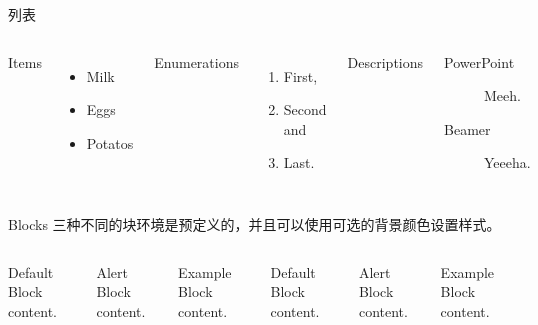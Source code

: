 \documentclass[9pt,UTF8]{ctexbeamer}
\begin{document}
\begin{frame}{列表}
  \begin{columns}[T,onlytextwidth]
      Items
      \begin{itemize}
        \item Milk 
        \item Eggs 
        \item Potatos
      \end{itemize}

      Enumerations
      \begin{enumerate}
        \item First, 
        \item Second and 
        \item Last.
      \end{enumerate}

      Descriptions
      \begin{description}
        \item[PowerPoint] Meeh. 
        \item[Beamer] Yeeeha.
      \end{description}
  \end{columns}
\end{frame}

\begin{frame}{Blocks}
  三种不同的块环境是预定义的，并且可以使用可选的背景颜色设置样式。

  \begin{columns}[T,onlytextwidth]
      \begin{block}{Default}
        Block content.
      \end{block}

      \begin{alertblock}{Alert}
        Block content.
      \end{alertblock}

      \begin{exampleblock}{Example}
        Block content.
      \end{exampleblock}



      \begin{block}{Default}
        Block content.
      \end{block}

      \begin{alertblock}{Alert}
        Block content.
      \end{alertblock}

      \begin{exampleblock}{Example}
        Block content.
      \end{exampleblock}

  \end{columns}
\end{frame}
\end{document}
